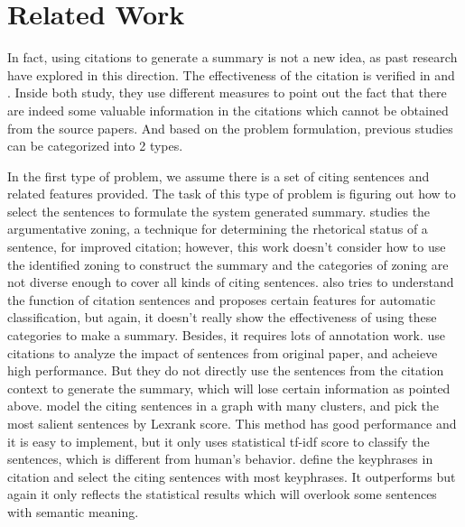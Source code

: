 \documentclass[hyp]{socreport}
\begin{document}
\section{Related Work}

  In fact, using citations to generate a summary is not a new idea, as past research have explored in this direction. The effectiveness of the citation is verified in \citep{elkiss2008} and \citep{mohammad2009}. Inside both study, they use different measures to point out the fact that there are indeed some valuable information in the citations which cannot be obtained from the source papers. And based on the problem formulation, previous studies can be categorized into 2 types. 

In the first type of problem, we assume there is a set of citing sentences and related features provided. The task of this type of problem is figuring out how to select the sentences to formulate the system generated summary. \citep{teufel2005} studies the argumentative zoning, a technique for determining the rhetorical status of a sentence, for improved citation; however, this work doesn’t consider how to use the identified zoning to construct the summary and the categories of zoning are not diverse enough to cover all kinds of citing sentences. \citep{teufel2006} also tries to understand the function of citation sentences and proposes certain features for automatic classification, but again, it doesn’t really show the effectiveness of using these categories to make a summary. Besides, it requires lots of annotation work. \citep{mei2008} use citations to analyze the impact of sentences from original paper, and acheieve high performance. But they do not directly use the sentences from the citation context to generate the summary, which will lose certain information as pointed above. \citep{qazvinian2008} model the citing sentences in a graph with many clusters, and pick the most salient sentences by Lexrank score. This method has good performance and it is easy to implement, but it only uses statistical tf-idf score to classify the sentences, which is different from human's behavior. \citep{qazvinian2010} define the keyphrases in citation and select the citing sentences with most keyphrases. It outperforms \citep{qazvinian2008} but again it only reflects the statistical results which will overlook some sentences with semantic meaning.  
\end{document}
